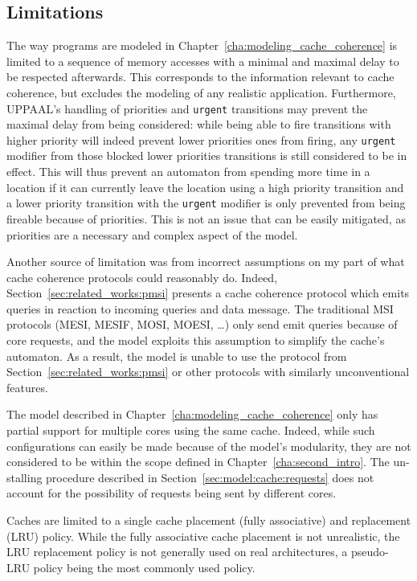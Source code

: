 \subsection{Limitations}
\label{sec:issue:limited_cache_actions}
The way programs are modeled in Chapter~\ref{cha:modeling_cache_coherence} is
limited to a sequence of memory accesses with a minimal and maximal delay to be
respected afterwards. This corresponds to the information relevant to cache
coherence, but excludes the modeling of any realistic application. Furthermore,
UPPAAL's handling of priorities and \texttt{urgent} transitions may prevent the
maximal delay from being considered: while being able to fire transitions with
higher priority will indeed prevent lower priorities ones from firing, any
\texttt{urgent} modifier from those blocked lower priorities transitions is
still considered to be in effect. This will thus prevent an automaton from
spending more time in a location if it can currently leave the location using a
high priority transition and a lower priority transition with the
\texttt{urgent} modifier is only prevented from being fireable because of
priorities. This is not an issue that can be easily mitigated, as priorities are
a necessary and complex aspect of the model.

Another source of limitation was from incorrect assumptions on my part of what
cache coherence protocols could reasonably do. Indeed,
Section~\ref{sec:related_works:pmsi} presents a cache coherence protocol which
emits queries in reaction to incoming queries and data message. The traditional
MSI protocols (MESI, MESIF, MOSI, MOESI, \ldots) only send emit queries because
of core requests, and the model exploits this assumption to simplify the
cache's automaton. As a result, the model is unable to use the protocol from
Section~\ref{sec:related_works:pmsi} or other protocols with similarly
unconventional features.

The model described in Chapter~\ref{cha:modeling_cache_coherence} only has
partial support for multiple cores using the same cache. Indeed, while such
configurations can easily be made because of the model's modularity, they are
not considered to be within the scope defined in
Chapter~\ref{cha:second_intro}. The un-stalling procedure described in
Section~\ref{sec:model:cache:requests} does not account for the possibility
of requests being sent by different cores.

Caches are limited to a single cache placement (fully associative) and
replacement (LRU) policy. While the fully associative cache placement is not
unrealistic, the LRU replacement policy is not generally used on real
architectures, a pseudo-LRU policy being the most commonly used policy.

